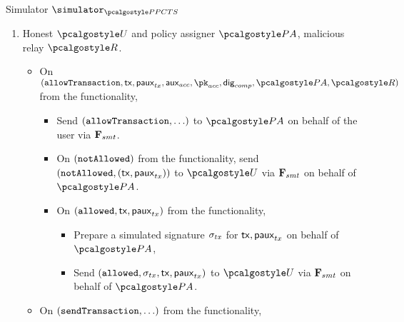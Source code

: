 \documentclass[runningheads,10pt]{llncs}
\numberwithin{equation}{section}
\begin{document}
\begin{simbox}{Simulator $\simulator_{\PPCTS}$}
\begin{enumerate}
\begin{itemize}
\begin{itemize}
        extract witnesses $\wit_{val} = (\saux_{tx})$ and $\wit_{comp} =
        (\comppolicy, \signature_{comp}, \signature_{tx}, \key, r)$ and output $\fail$
        is this fails.
      \item Output $\fail$ if $\signature_{comp}$ not in the list
        $\listvar{pol}$ or $\signature_{tx}$ not in the list $\listvar{tx}$.
      \item Call functionality on $(\sendTransaction, \tx, \paux_{tx}, \auxacc,
        \polas, \policydig, \signature_{comp}, \relay)$ if that has not been already done.
      \item {}Call $\func{ledger}$
        on behalf of the relay with input $(\append, \txdata)$.
      \end{itemize}
    \end{itemize}
  \item Honest $\user$ and policy assigner $\polas$, malicious relay $\relay$.
    \begin{itemize}
    \item On
      $(\allowTransaction, \tx, \pauxtx, \auxacc, \pkacc, \policydig, \polas,
      \relay)$ from the functionality,
      \begin{itemize}
      \item Send $(\mathtt{allowTransaction}, \ldots)$ to $\polas$ on behalf of the user via
        $\mathbf{F}_{{smt}}$.
      \item On $(\mathtt{notAllowed})$ from the functionality, send
        $(\mathtt{notAllowed}, (\mathsf{tx}, \mathsf{paux}_{tx}))$ to $\user$ via $\mathbf{F}_{{smt}}$ on behalf of
        $\polas$.
        \item On $(\mathtt{allowed}, \mathsf{tx}, \mathsf{paux}_{tx})$ from the functionality,
          \begin{itemize}
          \item Prepare a simulated signature $\signature_{tx}$ for $\mathsf{tx},
            \mathsf{paux}_{tx}$ on behalf of $\polas$,
          \item Send $(\mathtt{allowed}, \sigma_{tx}, \mathsf{tx}, \mathsf{paux}_{tx})$ to $\user$ via
            $\mathbf{F}_{{smt}}$ on behalf of $\polas$.
          \end{itemize}
      \end{itemize}
    \item On $(\mathtt{sendTransaction}, \ldots)$ from the functionality,
      \begin{itemize}

\end{itemize}
\end{itemize}
\end{enumerate}
\end{simbox}
\end{document}
